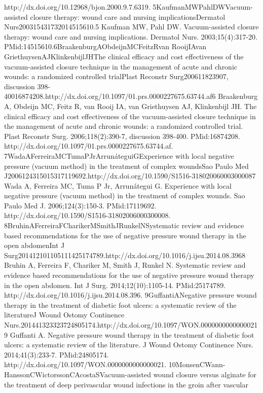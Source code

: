 \documentclass[numberinsection,times,10pt,spreadimages]{memoir}
\begin{document}
http://dx.doi.org/10.12968/bjon.2000.9.7.6319. 5KaufmanMWPahlDWVacuum-assisted
closure therapy: wound care and nursing
implicationsDermatol Nurs200315431732014515610.5 Kaufman MW, Pahl DW.
Vacuum-assisted closure therapy: wound care
and nursing implications. Dermatol Nurs. 2003;15(4):317-20.
PMid:14515610.6BraakenburgAObdeijnMCFeitzRvan RooijIAvan
GriethuysenAJKlinkenbijlJHThe clinical efficacy and cost effectiveness of the
vacuum-assisted closure technique in the management of acute and chronic
wounds: a randomized controlled trialPlast Reconstr Surg200611823907, discussion
398-40016874208.http://dx.doi.org/10.1097/01.prs.0000227675.63744.af6
Braakenburg A, Obdeijn MC, Feitz R, van Rooij IA, van Griethuysen
AJ, Klinkenbijl JH. The clinical efficacy and cost effectiveness of the
vacuum-assisted closure technique in the management of acute and chronic wounds:
a randomized controlled trial. Plast Reconstr Surg. 2006;118(2):390-7,
discussion 398-400. PMid:16874208.
http://dx.doi.org/10.1097/01.prs.0000227675.63744.af.
7WadaAFerreiraMCTumaPJrArrunáteguiGExperience with local negative pressure
(vacuum method) in the
treatment of complex woundsSao Paulo Med
J2006124315015317119692.http://dx.doi.org/10.1590/S1516-318020060003000087 Wada
A, Ferreira MC, Tuma P Jr, Arrunátegui G. Experience with
local negative pressure (vacuum method) in the treatment of complex wounds. Sao
Paulo Med J. 2006;124(3):150-3. PMid:17119692.
http://dx.doi.org/10.1590/S1516-31802006000300008.
8BruhinAFerreiraFCharikerMSmithJRunkelNSystematic review and evidence based
recommendations for the use
of negative pressure wound therapy in the open abdomenInt J
Surg201412101105111425174789.http://dx.doi.org/10.1016/j.ijsu.2014.08.3968
Bruhin A, Ferreira F, Chariker M, Smith J, Runkel N. Systematic
review and evidence based recommendations for the use of negative pressure wound
therapy in the open abdomen. Int J Surg. 2014;12(10):1105-14. PMid:25174789.
http://dx.doi.org/10.1016/j.ijsu.2014.08.396. 9GuffantiANegative pressure wound
therapy in the treatment of diabetic foot
ulcers: a systematic review of the literatureJ Wound Ostomy Continence
Nurs.201441323323724805174.http://dx.doi.org/10.1097/WON.00000000000000219
Guffanti A. Negative pressure wound therapy in the treatment of
diabetic foot ulcers: a systematic review of the literature. J Wound Ostomy
Continence Nurs. 2014;41(3):233-7. PMid:24805174.
http://dx.doi.org/10.1097/WON.0000000000000021.
10MonsenCWann-HanssonCWictorssonCAcostaSVacuum-assisted wound closure versus
alginate for the treatment
of deep perivascular wound infections in the groin after vascular
\end{document}
